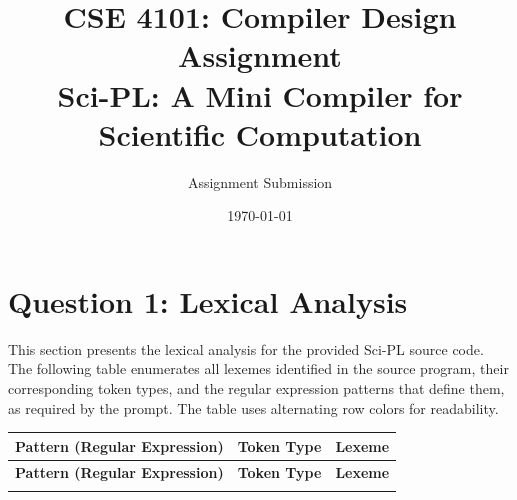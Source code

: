 \documentclass[11pt, letterpaper]{article}
\title{CSE 4101: Compiler Design Assignment\\Sci-PL: A Mini Compiler for Scientific Computation}
\author{Assignment Submission}
\date{\today}
\begin{document}
\maketitle

\section{Question 1: Lexical Analysis}
This section presents the lexical analysis for the provided Sci-PL source code. The following table enumerates all lexemes identified in the source program, their corresponding token types, and the regular expression patterns that define them, as required by the prompt. The table uses alternating row colors for readability.

\begin{longtable}{lll}
\rowcolor{tableheadbg} %
\toprule
\textbf{Pattern (Regular Expression)} & \textbf{Token Type} & \textbf{Lexeme} \\ %
\midrule
\endfirsthead
\rowcolor{tableheadbg}
\toprule
\textbf{Pattern (Regular Expression)} & \textbf{Token Type} & \textbf{Lexeme} \\
\midrule
\endhead
\bottomrule
\endlastfoot












\end{longtable}
\end{document}
